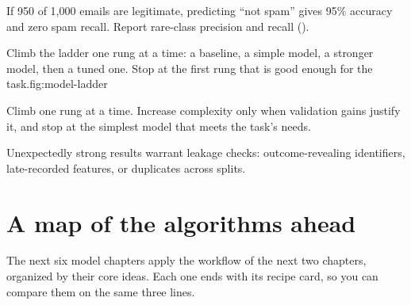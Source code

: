 \begin{workedexample}
If 950 of 1,000 emails are legitimate, predicting ``not spam'' gives 95\% accuracy and zero spam recall. Report rare-class precision and recall ().
\end{workedexample}

\begin{utpfig}{Climb the ladder one rung at a time: a baseline, a simple model, a stronger model, then a tuned one. Stop at the first rung that is good enough for the task.}{fig:model-ladder}
\end{utpfig}

\begin{analogy}
Climb one rung at a time. Increase complexity only when validation gains justify it, and stop at the simplest model that meets the task's needs.
\end{analogy}

\begin{pitfall}
Unexpectedly strong results warrant leakage checks: outcome-revealing identifiers, late-recorded features, or duplicates across splits.
\end{pitfall}

\section{A map of the algorithms ahead}

The next six model chapters apply the workflow of the next two chapters, organized by their core ideas. Each one ends with its recipe card, so you can compare them on the same three lines.

